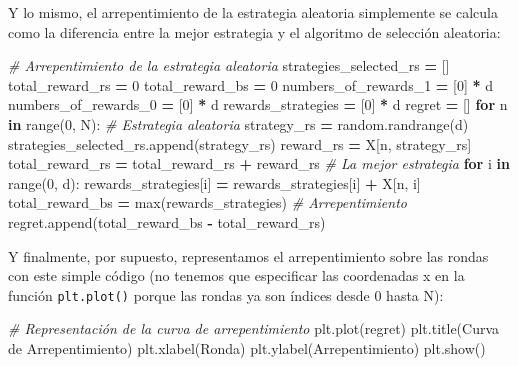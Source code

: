 \documentclass[
]{book}
\newenvironment{Shaded}{\begin{snugshade}}{\end{snugshade}}
\newcommand{\BuiltInTok}[1]{#1}
\newcommand{\CommentTok}[1]{\textcolor[rgb]{0.56,0.35,0.01}{\textit{#1}}}
\newcommand{\ControlFlowTok}[1]{\textcolor[rgb]{0.13,0.29,0.53}{\textbf{#1}}}
\newcommand{\DecValTok}[1]{\textcolor[rgb]{0.00,0.00,0.81}{#1}}
\newcommand{\KeywordTok}[1]{\textcolor[rgb]{0.13,0.29,0.53}{\textbf{#1}}}
\newcommand{\NormalTok}[1]{#1}
\newcommand{\OperatorTok}[1]{\textcolor[rgb]{0.81,0.36,0.00}{\textbf{#1}}}
\newcommand{\StringTok}[1]{\textcolor[rgb]{0.31,0.60,0.02}{#1}}
\begin{document}
Y lo mismo, el arrepentimiento de la estrategia aleatoria simplemente se calcula como la diferencia entre la mejor estrategia y el algoritmo de selección aleatoria:

\begin{Shaded}
\begin{Highlighting}[]
\CommentTok{\# Arrepentimiento de la estrategia aleatoria}
\NormalTok{strategies\_selected\_rs }\OperatorTok{=}\NormalTok{ []}
\NormalTok{total\_reward\_rs }\OperatorTok{=} \DecValTok{0}
\NormalTok{total\_reward\_bs }\OperatorTok{=} \DecValTok{0}
\NormalTok{numbers\_of\_rewards\_1 }\OperatorTok{=}\NormalTok{ [}\DecValTok{0}\NormalTok{] }\OperatorTok{*}\NormalTok{ d}
\NormalTok{numbers\_of\_rewards\_0 }\OperatorTok{=}\NormalTok{ [}\DecValTok{0}\NormalTok{] }\OperatorTok{*}\NormalTok{ d}
\NormalTok{rewards\_strategies }\OperatorTok{=}\NormalTok{ [}\DecValTok{0}\NormalTok{] }\OperatorTok{*}\NormalTok{ d}
\NormalTok{regret }\OperatorTok{=}\NormalTok{ []}
\ControlFlowTok{for}\NormalTok{ n }\KeywordTok{in} \BuiltInTok{range}\NormalTok{(}\DecValTok{0}\NormalTok{, N):}
    \CommentTok{\# Estrategia aleatoria}
\NormalTok{    strategy\_rs }\OperatorTok{=}\NormalTok{ random.randrange(d)}
\NormalTok{    strategies\_selected\_rs.append(strategy\_rs)}
\NormalTok{    reward\_rs }\OperatorTok{=}\NormalTok{ X[n, strategy\_rs]}
\NormalTok{    total\_reward\_rs }\OperatorTok{=}\NormalTok{ total\_reward\_rs }\OperatorTok{+}\NormalTok{ reward\_rs}
    \CommentTok{\# La mejor estrategia}
    \ControlFlowTok{for}\NormalTok{ i }\KeywordTok{in} \BuiltInTok{range}\NormalTok{(}\DecValTok{0}\NormalTok{, d):}
\NormalTok{        rewards\_strategies[i] }\OperatorTok{=}\NormalTok{ rewards\_strategies[i] }\OperatorTok{+}\NormalTok{ X[n, i]}
\NormalTok{    total\_reward\_bs }\OperatorTok{=} \BuiltInTok{max}\NormalTok{(rewards\_strategies)}
    \CommentTok{\# Arrepentimiento}
\NormalTok{    regret.append(total\_reward\_bs }\OperatorTok{{-}}\NormalTok{ total\_reward\_rs)}
\end{Highlighting}
\end{Shaded}

Y finalmente, por supuesto, representamos el arrepentimiento sobre las rondas con este simple código (no tenemos que especificar las coordenadas x en la función \texttt{plt.plot()} porque las rondas ya son índices desde 0 hasta N):

\begin{Shaded}
\begin{Highlighting}[]
\CommentTok{\# Representación de la curva de arrepentimiento}
\NormalTok{plt.plot(regret)}
\NormalTok{plt.title(}\StringTok{\textquotesingle{}Curva de Arrepentimiento\textquotesingle{}}\NormalTok{)}
\NormalTok{plt.xlabel(}\StringTok{\textquotesingle{}Ronda\textquotesingle{}}\NormalTok{)}
\NormalTok{plt.ylabel(}\StringTok{\textquotesingle{}Arrepentimiento\textquotesingle{}}\NormalTok{)}
\NormalTok{plt.show()}
\end{Highlighting}
\end{Shaded}
\end{document}
